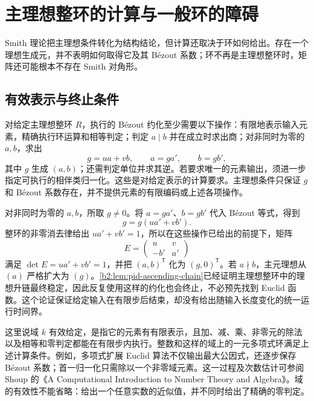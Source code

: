 
%
%

\section{主理想整环的计算与一般环的障碍}
\label{b2:sec:A02}

Smith 理论把主理想条件转化为结构结论，但计算还取决于环如何给出。存在一个理想生成元，并不表明如何取得它及其 Bézout 系数；环不再是主理想整环时，矩阵还可能根本不存在 Smith 对角形。

\subsection{有效表示与终止条件}
\label{b2:subsec:A02:01}

对给定主理想整环 \(R\)，执行的 Bézout 约化至少需要以下操作：有限地表示输入元素，精确执行环运算和相等判定；判定 \(a\mid b\) 并在成立时求出商；对非同时为零的 \(a,b\)，求出
\[
	g=ua+vb,\qquad a=ga',\qquad b=gb',
\]
其中 \(g\) 生成 \((a,b)\)；还需判定单位并求其逆。若要求唯一的元素输出，须进一步指定可执行的相伴类归一化。这些是对给定表示的计算要求。主理想条件只保证 \(g\) 和 Bézout 系数存在，并不提供元素的有限编码或上述各项操作。

\ProseParagraphBreak
对非同时为零的 \(a,b\)，所取 \(g\ne0\)。将 \(a=ga'\)、\(b=gb'\) 代入 Bézout 等式，得到
\[
	g=g(ua'+vb').
\]
整环的非零消去律给出 \(ua'+vb'=1\)，所以在这些操作已给出的前提下，矩阵
\[
	E=\begin{pmatrix}u&v\\-b'&a'\end{pmatrix}
\]
满足 \(\det E=ua'+vb'=1\)，并把 \((a,b)^{\mathsf T}\) 化为 \((g,0)^{\mathsf T}\)。若 \(a\nmid b\)，主元理想从 \((a)\) 严格扩大为 \((g)\)。\cref{b2:lem:pid-ascending-chain}已经证明主理想整环中的理想升链最终稳定，因此反复使用这样的约化也会终止，不必预先找到 Euclid 函数。这个论证保证给定输入在有限步后结束，却没有给出随输入长度变化的统一运行时间界。

\ProseParagraphBreak
这里说域 \(k\) 有效给定，是指它的元素有有限表示，且加、减、乘、非零元的除法以及相等和零判定都能在有限步内执行。整数和这样的域上的一元多项式环满足上述计算条件。例如，多项式扩展 Euclid 算法不仅输出最大公因式，还逐步保存 Bézout 系数；首一归一化只需除以一个非零域元素。这一过程及次数估计可参阅 Shoup 的《A Computational Introduction to Number Theory and Algebra》\cite[Section 17.3, Theorems 17.2, 17.4, pp. 469--472]{Shoup2008NumberTheoryAlgebra}。域的有效性不能省略：给出一个任意实数的近似值，并不同时给出了精确的零判定。

